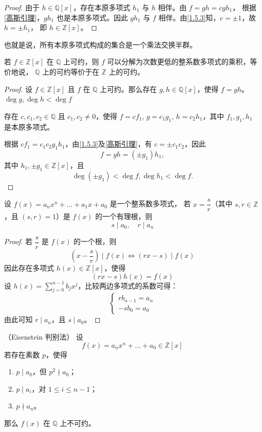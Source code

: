 \begin{proof}
	由于 \( h \in \mathbb{Q}[x] \)，存在本原多项式 \( h_1 \) 与 \( h \) 相伴。由 \( f = gh = c g h_1 \)，
	根据\ref{高斯引理}，\( g h_1 \) 也是本原多项式。因此 \( g h_1 \) 与 \( f \) 相伴。由\ref{1.5.3}知，\( c = \pm 1 \)，故 \( h = \pm h_1 \)，
	即 \( h \in \mathbb{Z}[x] \)。
\end{proof}
也就是说，所有本原多项式构成的集合是一个乘法交换半群。
\begin{corollary}
	若 \( f \in \mathbb{Z}[x] \) 在 \(\mathbb{Q}\) 上可约，则 \( f \) 可以分解为次数更低的整系数多项式的乘积，等价地说， \(\mathbb{Q}\) 上的可约等价于在 \(\mathbb{Z}\) 上的可约。
\end{corollary}
\begin{proof}
	设 \( f \in \mathbb{Z}[x] \) 且 \( f \) 在 \(\mathbb{Q}\) 上可约。那么存在 \( g, h \in \mathbb{Q}[x] \)，使得 \( f = gh \)。 \( \deg g, \deg h < \deg f \)
	
	存在 \( c, c_1, c_2 \in \mathbb{Q} \) 且 \( c_1, c_2 \neq 0 \)，使得 \( f = c f_1 \), \( g = c_1 g_1 \), \( h = c_2 h_1 \)，其中 \( f_1, g_1, h_1 \) 是本原多项式。
	
	根据 \( c f_1 = c_1 c_2 g_1 h_1 \)，由\ref{1.5.3}及\ref{高斯引理}，有 \( c = \pm c_1 c_2 \)，因此
	\[ f = gh = (\pm  g_1) h_1, \]
	其中 \( h_1, \pm  g_1 \in \mathbb{Z}[x] \)，且
	\[ \deg (\pm g_1) < \deg f,  \deg h_1 < \deg f. \]
	
\end{proof}
\begin{proposition}
	设 \( f(x) = a_n x^n + \dots + a_1 x + a_0 \) 是一个整系数多项式，
	若 \( x = \dfrac{s}{r} \)（其中 \( s,r \in \mathbb{Z} \)，且 \( (s,r)=1 \)）是 \( f(x) \) 的一个有理根，则
	\[
	s \mid a_0,\quad r \mid a_n
	\]
\end{proposition}
\begin{proof}
	若 \( \dfrac{s}{r} \) 是 \( f(x) \) 的一个根，则
	\[
	\left(x-\frac{s}{r}\right) \mid f(x) \iff (rx-s) \mid f(x)
	\]
	因此存在多项式 \( h(x) \in \mathbb{Z}[x] \)，使得
	\[
	(rx-s)h(x) = f(x)
	\]
	设 \( h(x) = \sum\limits_{j=0}^{n-1} b_j x^j \)，比较两边多项式的系数可得：
	\[
	\begin{cases}
		r b_{n-1} = a_n \\
		-s b_0 = a_0
	\end{cases}
	\]
	由此可知 \( r \mid a_n \)，且 \( s \mid a_0 \)。
	
\end{proof}
\begin{theorem}（Eisenstein 判别法）
	设
	\[
	f(x)=a_nx^n+\dots+a_0\in\mathbb{Z}[x]
	\]
	若存在素数 \(p\)，使得
	\begin{enumerate}
		\item \(p\mid a_0\)，但 \(p^2\nmid a_0\)；
		\item \(p\mid a_i\)，对 \(1\le i\le n-1\)；
		\item \(p\nmid a_n\)。
	\end{enumerate}
	那么 \(f(x)\) 在 \(\mathbb{Q}\) 上不可约。
\end{theorem}
